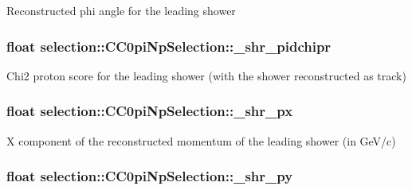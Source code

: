Reconstructed phi angle for the leading shower \hypertarget{classselection_1_1CC0piNpSelection_aae9294d7e4803ff991e611ea124769bc}{
\subsubsection[{\-\_\-shr\-\_\-pidchipr}]{\setlength{\rightskip}{0pt plus 5cm}float selection\-::\-C\-C0pi\-Np\-Selection\-::\-\_\-shr\-\_\-pidchipr\hspace{0.3cm}{\ttfamily [private]}}}\label{classselection_1_1CC0piNpSelection_aae9294d7e4803ff991e611ea124769bc}
Chi2 proton score for the leading shower (with the shower reconstructed as track) \hypertarget{classselection_1_1CC0piNpSelection_a52e2043c82f5de7f93ac9bad63563f18}{
\subsubsection[{\-\_\-shr\-\_\-px}]{\setlength{\rightskip}{0pt plus 5cm}float selection\-::\-C\-C0pi\-Np\-Selection\-::\-\_\-shr\-\_\-px\hspace{0.3cm}{\ttfamily [private]}}}\label{classselection_1_1CC0piNpSelection_a52e2043c82f5de7f93ac9bad63563f18}
X component of the reconstructed momentum of the leading shower (in Ge\-V/c) \hypertarget{classselection_1_1CC0piNpSelection_a436dd7081c84003dabb595289d745111}{
\subsubsection[{\-\_\-shr\-\_\-py}]{\setlength{\rightskip}{0pt plus 5cm}float selection\-::\-C\-C0pi\-Np\-Selection\-::\-\_\-shr\-\_\-py\hspace{0.3cm}{\ttfamily [private]}}}\label{classselection_1_1CC0piNpSelection_a436dd7081c84003dabb595289d745111}

